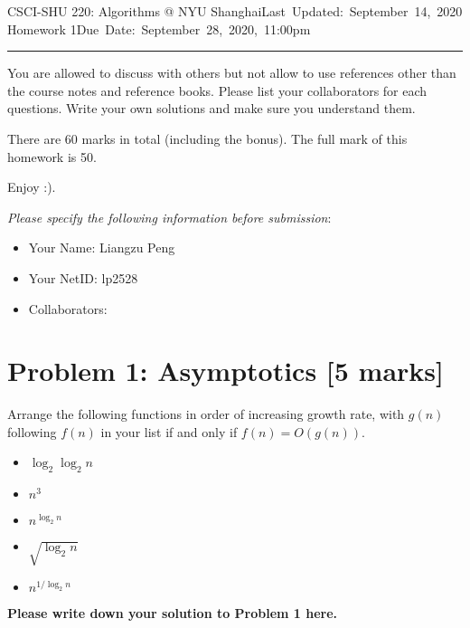 \documentclass[11pt,twoside]{article}
\makeatletter
\newcommand{\homework}[1]{
   \pagestyle{myheadings}
   \thispagestyle{plain}
   \newpage
   \setcounter{page}{1}
   \noindent
   \classname \hfill \mbox{\updatedday} \\
   \instname \hfill \mbox{\duedate}
   \rule{6.5in}{0.5mm}
   \vspace*{-0.1 in}
}
\newcommand{\problem}[1]{\section*{Problem #1}}
\def\classname{CSCI-SHU 220: Algorithms @ NYU Shanghai}
\def\updatedday{Last Updated: September 14, 2020}
\def\duedate{Due Date: September 28, 2020, 11:00pm}
\newenvironment{solution}{{\par\noindent\it Solution.}}{}
\def\instname{Homework 1}
\makeatother
\begin{document}
\homework{1}

You are allowed to discuss with others but not allow to use references other than the course notes and reference books. Please list your collaborators for each questions. Write your own solutions and make sure you understand them. 

There are 60 marks in total (including the bonus). The full mark of this homework is 50.  

Enjoy :). 

\textit{Please specify the following information before submission}:
\begin{itemize}
    \item Your Name: Liangzu Peng%
    \item Your NetID: lp2528%
    \item Collaborators: %
\end{itemize}


\problem{1: Asymptotics [5 marks]} 
Arrange the following functions in order of increasing growth rate, with $g(n)$ following $f(n)$ in your list if and only if $f(n)=O(g(n))$.
			\begin{itemize}
				\item $\log_2\log_2 n$
				\item $n^3$
				\item $n^{\log_2 n}$
				\item $\sqrt{\log_2 n}$
				\item $n^{1/\log_2 n}$
			\end{itemize}
\begin{solution}
\textbf{Please write down your solution to Problem 1 here.}
\end{solution}
\end{document}
